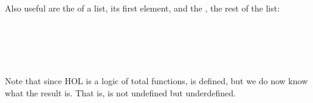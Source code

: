 \begin{isabellebody}
\begin{isamarkuptext}
\begin{isabelle}
\end{isabelle}
\sem
Also useful are the  of a list, its first element,
and the , the rest of the list:
\begin{isabelle}
 \\
\end{isabelle}
\begin{isabelle}
 \\
 \\
\end{isabelle}
Note that since HOL is a logic of total functions,  is defined,
but we do now know what the result is. That is,  is not undefined
but underdefined.
\endsem
\end{isamarkuptext}%
\isamarkuptrue%
%
\isadelimtheory
%
\endisadelimtheory
%
\isatagtheory
%
\endisatagtheory
{\isafoldtheory}%
%
\isadelimtheory
%
\endisadelimtheory
\end{isabellebody}%

